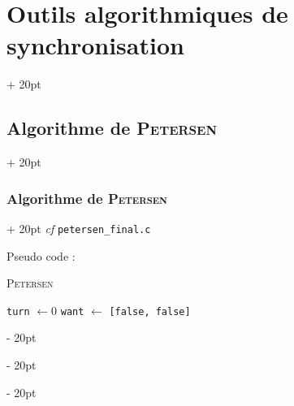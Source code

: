 \documentclass[a4paper, 12pt, twoside]{article}
\newenvironment{indalgo}[2][H]{
    \begin{minipage}{\linewidth-\leftskip-5pt}
        \begin{algorithm}[#1]
            \caption{#2}
}
{
        \end{algorithm}
    \end{minipage}
}
\newcommand{\ind}[1][20pt]{\advance\leftskip + #1}
\newcommand{\deind}[1][20pt]{\advance\leftskip - #1}
\newenvironment{indt}[2][20pt]{#2 \par \ind[#1]}{\par \deind} %
\begin{document}
\begin{indt}{\section{Outils algorithmiques de synchronisation}}
\begin{indt}{\subsection{Algorithme de \textsc{Petersen}}}
\begin{indt}{\subsubsection{Algorithme de \textsc{Petersen}}}
                \textit{cf} \texttt{petersen\_final.c}

                Pseudo code :

% 
% 
%                     
% 
% 
%                         
% 
%                         
% 
%                         
    
                \begin{indalgo}{\textsc{Petersen}}
                    \texttt{turn} $\gets 0$\;
                    \texttt{want} $\gets$ \texttt{[false, false]}\;


                \end{indalgo}


\end{indt}
\end{indt}
\end{indt}
\end{document}

